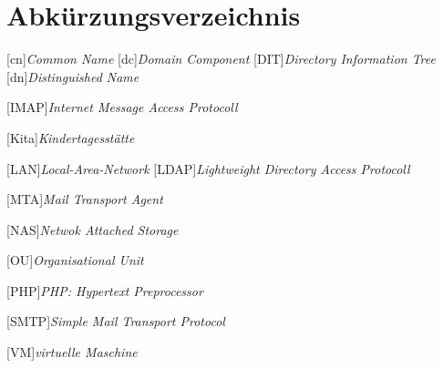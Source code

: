 
\chapter*{Abkürzungsverzeichnis}
\markboth{}{}

\begin{acronym}[]
[cn]{\textit{Common Name}}
[dc]{\textit{Domain Component}}
[DIT]{\textit{Directory Information Tree}}
[dn]{\textit{Distinguished Name}}




[IMAP]{\textit{Internet Message Access Protocoll}}


[Kita]{\textit{Kindertagesstätte}}

[LAN]{\textit{Local-Area-Network}}
[LDAP]{\textit{Lightweight Directory Access Protocoll}}

[MTA]{\textit{Mail Transport Agent}}

[NAS]{\textit{Netwok Attached Storage}}

[OU]{\textit{Organisational Unit}}

[PHP]{\textit{PHP: Hypertext Preprocessor}}



[SMTP]{\textit{Simple Mail Transport Protocol}}



[VM]{\textit{virtuelle Maschine}}








\end{acronym}